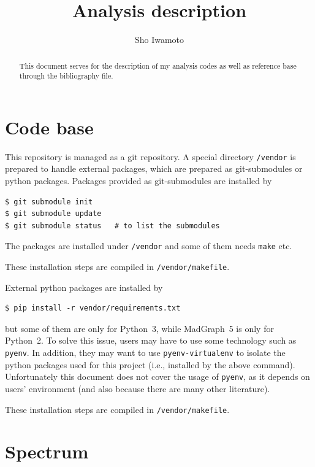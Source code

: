 \documentclass[a4paper,10pt,captions=tableheading,DIV=14]{scrartcl}
\author{Sho Iwamoto}
\title{Analysis description}
\numberwithin{equation}{section}
\newcommand\file[1]{\lstinline[basicstyle=\ttfamily\color{navy}]{#1}}
\begin{document}
\begin{center}{\makeatletter
{\huge{}\@title}\par\vspace{2em}
{\Large \@author}\par\vspace{2em}
}
\begin{abstract}\noindent
This document serves for the description of my analysis codes as well as reference base through the bibliography file.
\end{abstract}
\end{center}

\section{Code base}
This repository is managed as a git repository.
A special directory \file{/vendor} is prepared to handle external packages, which are prepared as git-submodules or python packages.
Packages provided as git-submodules are installed by
\begin{verbatim}
$ git submodule init
$ git submodule update
$ git submodule status   # to list the submodules
\end{verbatim}
The packages are installed under \file{/vendor} and some of them needs \texttt{make} etc.

These installation steps are compiled in \file{/vendor/makefile}.

External python packages are installed by
\begin{verbatim}
$ pip install -r vendor/requirements.txt
\end{verbatim}
but some of them are only for Python~3, while MadGraph~5 is only for Python~2.
To solve this issue, users may have to use some technology such as \texttt{pyenv}.
In addition, they may want to use \texttt{pyenv-virtualenv} to isolate the python packages used for this project (i.e., installed by the above command).
Unfortunately this document does not cover the usage of \texttt{pyenv}, as it depends on users' environment (and also because there are many other literature).


These installation steps are compiled in \file{/vendor/makefile}.


\section{Spectrum}
\end{document}
